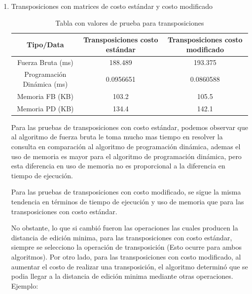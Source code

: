 \begin{enumerate}
    \item Transposiciones con matrices de costo estándar y costo modificado
    
        \begin{table}[H]
        \centering
        \begin{tabular}{|c|c|c|}
        \hline
        \textbf{Tipo/Data} & \textbf{Transposiciones costo estándar} & \textbf{Transposiciones costo modificado}\\ \hline
        Fuerza Bruta (ms) & 188.489 & 193.375\\ \hline
        Programación Dinámica (ms) & 0.0956651 & 0.0860588 \\ \hline
        Memoria FB (KB) & 103.2 & 105.5   \\ \hline
        Memoria PD (KB) & 134.4 & 142.1 \\ \hline
        
        \end{tabular}
        \caption{Tabla con valores de prueba para transposiciones}
        \label{tab:tabla1}
        \end{table}


    Para las pruebas de transposiciones con costo estándar, podemos observar que 
    al algoritmo de fuerza bruta le toma mucho mas tiempo en resolver
    la consulta en comparación al algoritmo de programación dinámica,
    ademas el uso de memoria es mayor para el algoritmo de programación dinámica, 
    pero esta diferencia en uso de memoria no es proporcional a la diferencia
    en tiempo de ejecución.

    Para las pruebas de transposiciones con costo modificado, se sigue la misma tendencia
    en términos de tiempo de ejecución y uso de memoria que para las transposiciones con
    costo estándar.

    No obstante, lo que si cambió fueron las operaciones las cuales producen la distancia
    de edición minima, para las transposiciones con costo estándar, siempre se selecciono
    la operación de transposición (Esto ocurre para ambos algoritmos). Por otro lado, para las transposiciones con costo modificado, al aumentar
    el costo de realizar una transposición, el algoritmo determinó que
    se podia llegar a la distancia de edición minima mediante otras operaciones.
    Ejemplo:

    \begin{figure}[H]
        \centering
      

\end{figure}
\end{enumerate}
